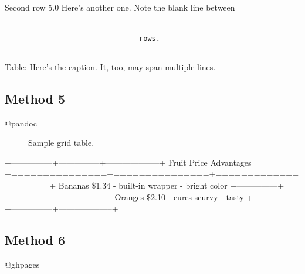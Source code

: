Second row 5.0 Here's another one. Note
 the blank line between

\begin{adjustwidth}{2.5em}{2.5em}
\begin{verbatim}

                                rows.

\end{verbatim}
\end{adjustwidth}

\begin{center}\rule{3in}{0.4pt}\end{center}


Table: Here's the caption. It, too, may span
multiple lines.

\subsection{Method 5}
\label{method5}

\begin{description}

\item[@pandoc]

Sample grid table.
\end{description}

+---------------+---------------+--------------------+
\textbar{} Fruit \textbar{} Price \textbar{} Advantages \textbar{}
+===============+===============+====================+
\textbar{} Bananas \textbar{} \$1.34 \textbar{} - built-in wrapper \textbar{}
\textbar{} \textbar{} \textbar{} - bright color \textbar{}
+---------------+---------------+--------------------+
\textbar{} Oranges \textbar{} \$2.10 \textbar{} - cures scurvy \textbar{}
\textbar{} \textbar{} \textbar{} - tasty \textbar{}
+---------------+---------------+--------------------+ 

\subsection{Method 6}
\label{method6}

@ghpages

